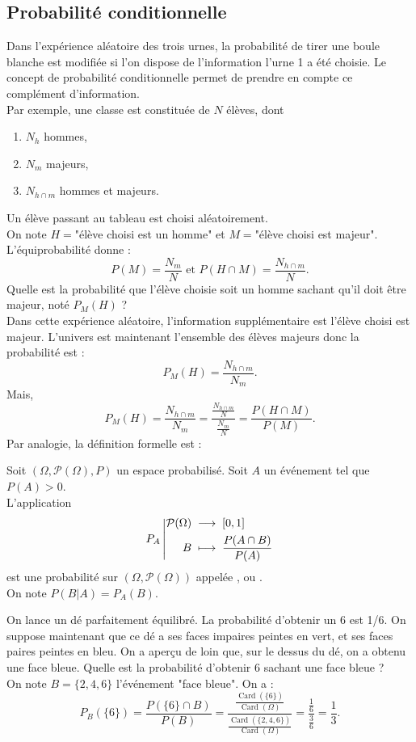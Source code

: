 \documentclass{book}
\begin{document}
\subsection{Probabilité conditionnelle}
Dans l'expérience aléatoire des trois urnes, la probabilité de tirer une boule blanche est modifiée si l'on dispose de l'information l'urne 1 a été choisie.  
Le concept de probabilité conditionnelle permet de prendre en compte ce complément d'information.\\
Par exemple, une classe est constituée de $N$ élèves, dont 
\begin{enumerate}
\item $N_h$ hommes,
\item $N_m$ majeurs,
\item $N_{h\cap m}$ hommes et majeurs.
\end{enumerate}
Un élève passant au tableau est choisi aléatoirement. \\
On note $H=$"élève choisi est un homme" et  $M=$"élève choisi est majeur".\\
L'équiprobabilité donne  :
$$ P(M) = \frac{N_m}{N}\text{ et } P(H\cap M)=\frac{N_{h\cap m}}{N}.$$
Quelle est la probabilité que l'élève choisie soit un homme sachant qu'il doit être majeur, noté $P_M(H)$ ? \\
Dans cette expérience aléatoire, l'information supplémentaire est l'élève choisi  est majeur. L'univers est maintenant l'ensemble des élèves majeurs donc la probabilité est :
$$P_M(H) =\frac{N_{h\cap m}}{N_m}.$$
Mais,
$$P_M(H) =\frac{N_{h\cap m}}{N_m}=\frac{\frac{N_{h\cap m}}{N}}{\frac{N_m}{N}}=\frac{P(H\cap M)}{P(M)}.$$ 
Par analogie, la définition formelle est :
\begin{Definition}
Soit $(\Omega,\mathcal{P}(\Omega),P)$ un espace probabilisé.
Soit $A$ un événement tel que $P(A)>0$.\\
L'application
\[ {P_A}\left|\begin{aligned}{\mathcal{P}(\Omega)}&\;\longrightarrow\;{[0,1]}\\{B}&\;\longmapsto\;{\frac{P(A\cap B)}{P(A)}}\end{aligned}\right. \]
est une probabilité sur $(\Omega,\mathcal{P}(\Omega))$
appelée ,
ou .\\
On note $P(B|A) = P_A(B)$.
\end{Definition}

\begin{Exemple}
On lance un dé parfaitement équilibré. La probabilité d'obtenir un 6 est 1/6. On suppose maintenant que ce dé a ses faces impaires peintes en vert, et ses faces paires peintes en bleu. On a aperçu de loin que, sur le dessus du dé, on a obtenu une face bleue. Quelle est la probabilité d'obtenir 6 sachant une face bleue ?\\
On note $B=\{2,4,6\}$ l'événement "face bleue". On a :
$$P_B(\{6\})=\frac{P(\{6\}\cap B)}{P(B)}=\frac{\frac{\operatorname{Card}( \{6\})}{\operatorname{Card}( \Omega)} }{\frac{\operatorname{Card}( \{2,4,6\})}{\operatorname{Card}( \Omega)} }=\frac{\frac 1 6 }{\frac 3 6 }=\frac 1 3.$$
\end{Exemple}
\end{document}

